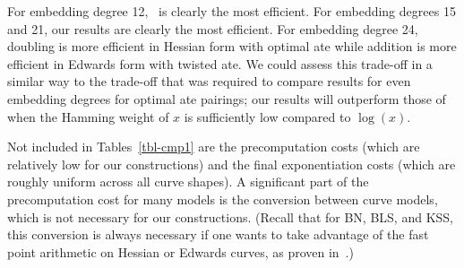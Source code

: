 For embedding degree 12,~\cite{2014/LWZ} is clearly the most efficient.
For embedding degrees 15 and 21, our results are clearly the most efficient.
For embedding degree 24, doubling is more efficient in Hessian form with optimal ate
while addition is more efficient in Edwards form with twisted ate. 
We could assess this trade-off in a similar way to the trade-off that was required to compare results for even embedding degrees for optimal ate pairings; 
our results will outperform those of~\cite{2014/LWZ} when the Hamming weight of 
$x$ is sufficiently low compared to $\log(x)$.

Not included in Tables~\ref{tbl-cmp1} are the 
precomputation costs (which are relatively low for our constructions) and the final exponentiation costs (which are roughly uniform across all curve shapes).
A significant part of the precomputation cost for many models is the conversion
between curve models, which is not necessary for our constructions.
(Recall that for BN, BLS, and KSS, this conversion is always necessary if one wants to take advantage of
the fast point arithmetic on Hessian or Edwards curves, as proven in~\cite{2013/bos-pairing}.)

